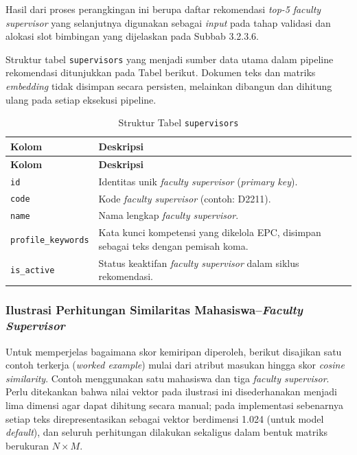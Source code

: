 Hasil dari proses perangkingan ini berupa daftar rekomendasi \textit{top-5} \textit{faculty supervisor} yang selanjutnya digunakan sebagai \textit{input} pada tahap validasi dan alokasi slot bimbingan yang dijelaskan pada Subbab 3.2.3.6.

Struktur tabel \texttt{supervisors} yang menjadi sumber data utama dalam pipeline rekomendasi ditunjukkan pada Tabel berikut. Dokumen teks dan matriks \textit{embedding} tidak disimpan secara persisten, melainkan dibangun dan dihitung ulang pada setiap eksekusi pipeline.

\begin{longtable}[c]{|p{4.5cm}|p{9.5cm}|}

\caption{Struktur Tabel \texttt{supervisors}} \label{table:struktur_tabel_supervisors} \\ 
\hline
\textbf{Kolom} & \textbf{Deskripsi} \\ \hline
\endfirsthead

\hline
\textbf{Kolom} & \textbf{Deskripsi} \\ \hline
\endhead

\hline
\endlastfoot

\texttt{id} & Identitas unik \textit{faculty supervisor} (\textit{primary key}). \\ \hline
\texttt{code} & Kode \textit{faculty supervisor} (contoh: D2211). \\ \hline
\texttt{name} & Nama lengkap \textit{faculty supervisor}. \\ \hline
\texttt{profile\_keywords} & Kata kunci kompetensi yang dikelola EPC, disimpan sebagai teks dengan pemisah koma. \\ \hline
\texttt{is\_active} & Status keaktifan \textit{faculty supervisor} dalam siklus rekomendasi. \\ \hline

\end{longtable}

\subsubsection{Ilustrasi Perhitungan Similaritas Mahasiswa--\textit{Faculty Supervisor}}\label{ilustrasi-perhitungan-similaritas}

Untuk memperjelas bagaimana skor kemiripan diperoleh, berikut disajikan satu contoh terkerja (\textit{worked example}) mulai dari atribut masukan hingga skor \textit{cosine similarity}. Contoh menggunakan satu mahasiswa dan tiga \textit{faculty supervisor}. Perlu ditekankan bahwa nilai vektor pada ilustrasi ini disederhanakan menjadi lima dimensi agar dapat dihitung secara manual; pada implementasi sebenarnya setiap teks direpresentasikan sebagai vektor berdimensi 1.024 (untuk model \textit{default}), dan seluruh perhitungan dilakukan sekaligus dalam bentuk matriks berukuran $N \times M$.

